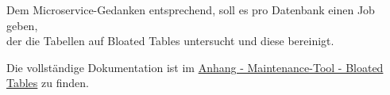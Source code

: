 \begin{flushleft}
    Dem Microservice-Gedanken entsprechend, soll es pro Datenbank einen Job geben,\\
    der die Tabellen auf Bloated Tables untersucht und diese bereinigt.
\end{flushleft}
\begin{flushleft}
    Die vollständige Dokumentation ist im \hyperref[subsec:maintenance_bloated_tables]{Anhang - Maintenance-Tool - Bloated Tables} zu finden.
\end{flushleft}